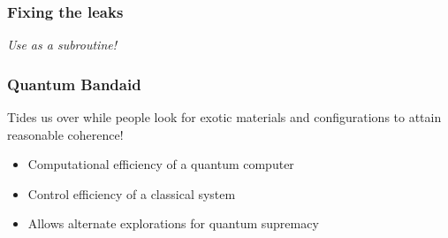 
\begin{frame}
    \frametitle{Fixing the leaks}


    \begin{center}
        \emph{\textcolor{Periwinkle}{Use as a subroutine!}}
    \end{center}

    \begin{center}
        \vspace{1em}
        \begin{figure}
        \end{figure}
        \vspace{1em}
    \end{center}

\end{frame}

\begin{frame}
    \frametitle{Quantum Bandaid}

    Tides us over while people look for exotic materials and configurations to
    attain reasonable coherence!

    \begin{itemize}
        \item[\textcolor{OliveGreen}{\checkmark}] Computational efficiency of a quantum computer
        \item[\textcolor{OliveGreen}{\checkmark}] Control efficiency of a classical system
        \item[\textcolor{OliveGreen}{\checkmark}] Allows alternate explorations for quantum supremacy
    \end{itemize}

\end{frame}

